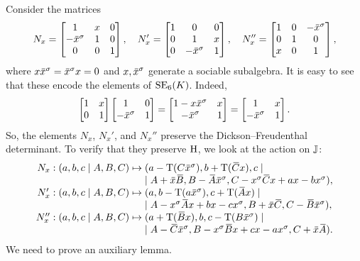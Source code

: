 Consider the matrices
\begin{equation}
	N_x = \begin{bmatrix}
		1 & x & 0 \\
		-\ovx^{\s} & 1 & 0 \\
		0 & 0 & 1
	\end{bmatrix},\quad
	N_x' = \begin{bmatrix}
		1 & 0 & 0 \\
		0 & 1 & x \\
		0 & -\ovx^{\s} & 1
	\end{bmatrix},\quad
	N_x'' = \begin{bmatrix}
		1 & 0 & -\ovx^{\s} \\
		0 & 1 & 0 \\
		x & 0 & 1
	\end{bmatrix},
\end{equation}
where $x\ovx^{\s} = \ovx^{\s}x = 0$ and $x,\mathord{\mbox{\hspace*{0pt}}\,\overline{\!x\!\!\;}\!\:}\mbox{\hspace*{0pt}}^{\sigma}$ generate a sociable subalgebra. 
It is easy to see that these encode the elements of $\mathrm{SE}_6(K)$. Indeed,
\begin{equation}
	\begin{bmatrix}
		1 & x \\
		0 & 1
	\end{bmatrix}
	\begin{bmatrix}
		1 & 0 \\
		-\ovx ^{\s} & 1
	\end{bmatrix} = 
	\begin{bmatrix}
		1 - x\ovx ^{\s} & x \\
		-\ovx ^{\s} & 1 
	\end{bmatrix} = 
	\begin{bmatrix}
		1 & x \\
		-\ovx ^{\s} & 1
	\end{bmatrix}.
\end{equation}
So, the elements $N_x$, $N_x'$, and $N_x''$ preserve the Dickson--Freudenthal determinant. 
To verify that they preserve $\mathrm{H}$, we look at the action on $\mathbb{J}$:
\begin{equation}
	\label{eq:3_nx_image}
	\begin{array}{r@{\;}c@{\;}l}
		N_x: (a,b,c\mid A,B,C) & \mapsto &
		(a-\Tr(C\ovx ^{\s}), b+\Tr(\ovC x), c \mid \\
		& & \mid	A+\ovx \ovB , B-\ovA \ovx ^{\s},C-x^{\s}\ovC x+ax-bx^{\s}), \\
		
		N_x': (a,b,c\mid A,B,C) & \mapsto & 
		(a, b-\Tr(a\ovx^{\s}), c+\Tr(\ovA x) \mid \\
		& & \mid	A - x^{\s} \ovA x + bx-cx^{\s}, B + \ovx \ovC, C - \ovB \ovx^{\s}), \\
		
		N_x'': (a,b,c\mid A,B,C) & \mapsto &
		(a+\Tr(\ovB x), b, c-\Tr(B\ovx^{\s}) \mid \\
		& & \mid 	A-\ovC\ovx^{\s}, B-x^{\s}\ovB x + cx - ax^{\s}, C+\ovx\ovA).
	\end{array}
\end{equation}
We need to prove an auxiliary lemma.

